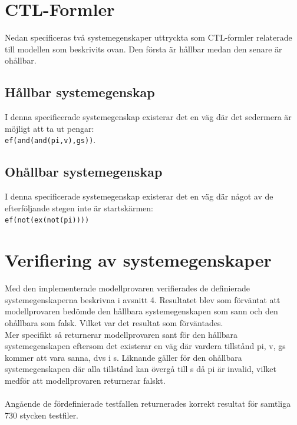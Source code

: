\documentclass[]{article}
\begin{document}
\section{CTL-Formler}
Nedan specificeras två systemegenskaper uttryckta som CTL-formler relaterade till modellen som beskrivits ovan. Den första är hållbar medan den senare är ohållbar. 

\subsection{Hållbar systemegenskap}

I denna specificerade systemegenskap existerar det en väg där det sedermera är möjligt att ta ut pengar:\\

\texttt{ef(and(and(pi,v),gs))}.



\subsection{Ohållbar systemegenskap}

I denna specificerade systemegenskap existerar det en väg där något av de efterföljande stegen inte är startskärmen:\\

\texttt{ef(not(ex(not(pi))))}

\section{Verifiering av systemegenskaper}

Med den implementerade modellprovaren verifierades de definierade systemegenskaperna beskrivna i avsnitt 4. Resultatet blev som förväntat att modellprovaren bedömde den hållbara systemegenskapen som sann och den ohållbara som falsk. Vilket var det resultat som förväntades.\\

Mer specifikt så returnerar modellprovaren sant för den hållbara systemegenskapen eftersom det existerar en väg där vardera tillstånd pi, v, gs kommer att vara sanna, dvs i s. Liknande gäller för den ohållbara systemegenskapen där alla tillstånd kan övergå till s då pi är invalid, vilket medför att modellprovaren returnerar falskt. 
\\\\
Angående de fördefinierade testfallen returnerades korrekt resultat för samtliga 730 stycken testfiler. 
\end{document}
